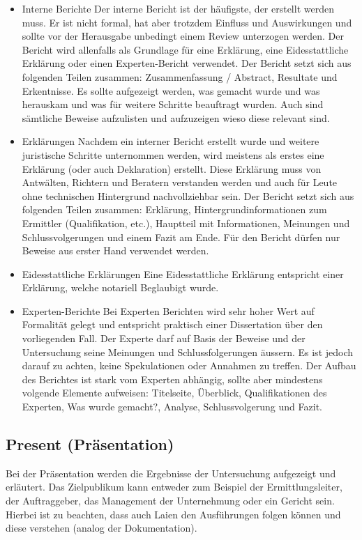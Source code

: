 \begin{itemize}
\item Interne Berichte
Der interne Bericht ist der häufigste, der erstellt werden muss. Er ist nicht formal, hat aber trotzdem Einfluss und Auswirkungen und sollte vor der Herausgabe unbedingt einem Review unterzogen werden. Der Bericht wird allenfalls als Grundlage für eine Erklärung, eine Eidesstattliche Erklärung oder einen Experten-Bericht verwendet. Der Bericht setzt sich aus folgenden Teilen zusammen: Zusammenfassung / Abstract, Resultate und Erkentnisse. Es sollte aufgezeigt werden, was gemacht wurde und was herauskam und was für weitere Schritte beauftragt wurden. Auch sind sämtliche Beweise aufzulisten und aufzuzeigen wieso diese relevant sind.
\item Erklärungen
Nachdem ein interner Bericht erstellt wurde und weitere juristische Schritte unternommen werden, wird meistens als erstes eine Erklärung (oder auch Deklaration) erstellt. Diese Erklärung muss von Antwälten, Richtern und Beratern verstanden werden und auch für Leute ohne technischen Hintergrund nachvollziehbar sein. Der Bericht setzt sich aus folgenden Teilen zusammen: Erklärung, Hintergrundinformationen zum Ermittler (Qualifikation, etc.), Hauptteil mit Informationen, Meinungen und Schlussvolgerungen und einem Fazit am Ende. Für den Bericht dürfen nur Beweise aus erster Hand verwendet werden.
\item Eidesstattliche Erklärungen
Eine Eidesstattliche Erklärung entspricht einer Erklärung, welche notariell Beglaubigt wurde.
\item Experten-Berichte
Bei Experten Berichten wird sehr hoher Wert auf Formalität gelegt und entspricht praktisch einer Dissertation über den vorliegenden Fall. Der Experte darf auf Basis der Beweise und der Untersuchung seine Meinungen und Schlussfolgerungen äussern. Es ist jedoch darauf zu achten, keine Spekulationen oder Annahmen zu treffen. Der Aufbau des Berichtes ist stark vom Experten abhängig, sollte aber mindestens volgende Elemente aufweisen: Titelseite, Überblick, Qualifikationen des Experten, Was wurde gemacht?, Analyse, Schlussvolgerung und Fazit.
\end{itemize}

\subsection{Present (Präsentation)}
Bei der Präsentation werden die Ergebnisse der Untersuchung aufgezeigt und erläutert. Das Zielpublikum kann entweder zum Beispiel der Ermittlungsleiter, der Auftraggeber, das Management der Unternehmung oder ein Gericht sein. Hierbei ist zu beachten, dass auch Laien den Ausführungen folgen können und diese verstehen (analog der Dokumentation).

